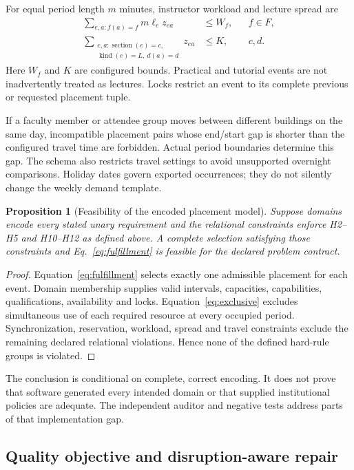 \documentclass[pdflatex,sn-mathphys-num]{sn-jnl}
\theoremstyle{thmstyleone}
\newtheorem{proposition}[theorem]{Proposition}
\theoremstyle{thmstyletwo}
\theoremstyle{thmstylethree}
\begin{document}
For equal period length $m$ minutes, instructor workload and lecture spread are
\begin{align}
\sum_{e,a:f(a)=f}m\ell_e z_{ea}&\leq W_f, &&f\in F,\label{eq:load}\\
\sum_{\substack{e,a:\operatorname{section}(e)=c,\\\operatorname{kind}(e)=L,\ d(a)=d}}z_{ea}&\leq K,
&&c,d.\label{eq:spread}
\end{align}
Here $W_f$ and $K$ are configured bounds. Practical and tutorial events are not inadvertently treated as lectures. Locks restrict an event to its complete previous or requested placement tuple.

If a faculty member or attendee group moves between different buildings on the same day, incompatible placement pairs whose end/start gap is shorter than the configured travel time are forbidden. Actual period boundaries determine this gap. The schema also restricts travel settings to avoid unsupported overnight comparisons. Holiday dates govern exported occurrences; they do not silently change the weekly demand template.

\begin{proposition}[Feasibility of the encoded placement model]\label{prop:feasibility}
Suppose domains encode every stated unary requirement and the relational constraints enforce H2--H5 and H10--H12 as defined above. A complete selection satisfying those constraints and Eq.~\eqref{eq:fulfillment} is feasible for the declared problem contract.
\end{proposition}
\begin{proof}
Equation~\eqref{eq:fulfillment} selects exactly one admissible placement for each event. Domain membership supplies valid intervals, capacities, capabilities, qualifications, availability and locks. Equation~\eqref{eq:exclusive} excludes simultaneous use of each required resource at every occupied period. Synchronization, reservation, workload, spread and travel constraints exclude the remaining declared relational violations. Hence none of the defined hard-rule groups is violated.
\end{proof}
The conclusion is conditional on complete, correct encoding. It does not prove that software generated every intended domain or that supplied institutional policies are adequate. The independent auditor and negative tests address parts of that implementation gap.

\subsection{Quality objective and disruption-aware repair}
\end{document}
